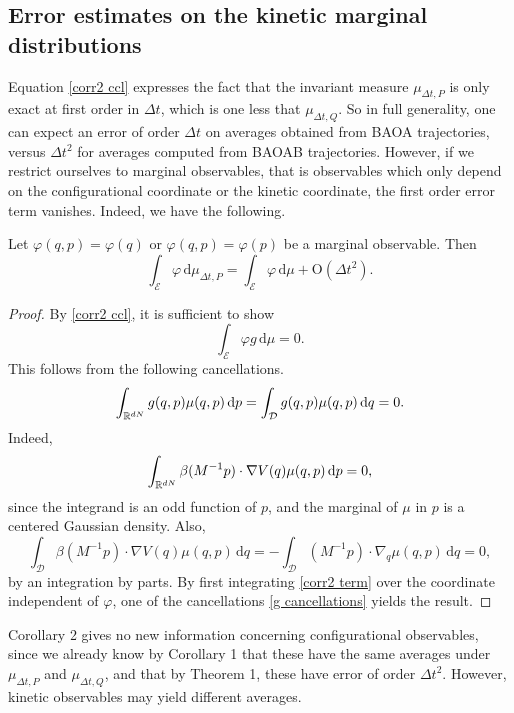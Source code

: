 \subsection{Error estimates on the kinetic marginal distributions}\label{second order on the marginals}
Equation \eqref{corr2 ccl} expresses the fact that the invariant measure $\mu_{\Delta t,P}$ is only exact at first order in $\Delta t$, which is one less that $\mu_{\Delta t,Q}$.
So in full generality, one can expect an error of order $\Delta t$ on averages obtained from BAOA trajectories, versus $\Delta t^2$ for averages computed from BAOAB trajectories. However, if we restrict ourselves to marginal observables, that is observables which only depend on the configurational coordinate or the kinetic coordinate, the first order error term vanishes.
Indeed, we have the following.
\begin{corollary}\label{corr3 second order marginals}
Let $\varphi(q,p)=\varphi(q)$ or $\varphi(q,p)=\varphi(p)$ be a marginal observable. Then
$$\int_{\mathcal E}\varphi\, \mathrm{d} \mu_{\Delta t,P}=\int_{\mathcal E}\varphi\, \mathrm{d}\mu +\mathrm{O}(\Delta t^2).$$
\end{corollary}
\begin{proof}
  By \eqref{corr2 ccl}, it is sufficient to show
  \begin{equation}\label{corr2 term}\int_{\mathcal E}\varphi g\, \mathrm{d}\mu=0.\end{equation}
  This follows from the following cancellations.
  \begin{equation}
    \label{g cancellations}
      \int_{\mathbb{R}^{dN}}g(q,p)\mu(q,p)\,\mathrm{d}p=\int_{\mathcal D}g(q,p)\mu(q,p)\,\mathrm{d}q=0.
  \end{equation}
  Indeed,
  $$\int_{\mathbb{R}^{dN}}\beta (M^{-1}p)\cdot \nabla V(q)\mu(q,p)\,\mathrm{d}p=0,$$
since the integrand is an odd function of $p$, and the marginal of $\mu$ in $p$ is a centered Gaussian density. Also,
$$\int_{\mathcal D}\beta(M^{-1}p)\cdot \nabla V(q)\mu(q,p)\,\mathrm{d}q=-\int_{\mathcal D}(M^{-1}p)\cdot \nabla_q\mu(q,p)\,\mathrm{d}q=0,$$
by an integration by parts. By first integrating \eqref{corr2 term} over the coordinate independent of $\varphi$, one of the cancellations \eqref{g cancellations} yields the result.
\end{proof}

Corollary 2 gives no new information concerning configurational observables, since we already know by Corollary 1 that these have the same averages under $\mu_{\Delta t,P}$ and $\mu_{\Delta t,Q}$, and that by Theorem 1, these have error of order $\Delta t^2$.
However, kinetic observables may yield different averages.

